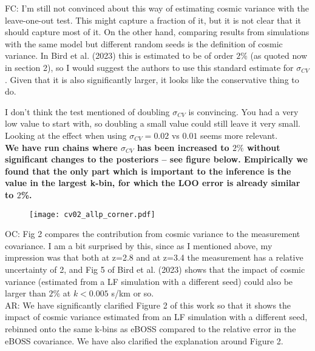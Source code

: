\documentclass[12pt]{article}
\begin{document}
FC: I’m still not convinced about this way of estimating cosmic variance with the leave-one-out test. This might capture a fraction of it, but it is not clear that it should capture most of it. On the other hand, comparing results from simulations with the same model but different random seeds is the definition of cosmic variance. In Bird et al. (2023) this is estimated to be of order $2\%$ (as quoted now in section 2), so I would suggest the authors to use this standard estimate for $\sigma_{CV}$. Given that it is also significantly larger, it looks like the conservative thing to do.

I don’t think the test mentioned of doubling $\sigma_{CV}$ is convincing. You had a very low value to start with, so doubling a small value could still leave it very small. Looking at the effect when using $\sigma_{CV} = 0.02$ vs $0.01$ seems more relevant.\\

\textbf{We have run chains where $\sigma_{CV}$ has been increased to $2\%$ without significant changes to the posteriors -- see figure below. Empirically we found that the only part which is important to the inference is the value in the largest k-bin, for which the LOO error is already similar to $2$\%.}

\begin{figure}[h!]
    \centering
    \texttt{[image: cv02\_allp\_corner.pdf]}
\end{figure}

\hrulefill \newline

OC: Fig 2 compares the contribution from cosmic variance to the measurement covariance. I am a bit surprised by this, since as I mentioned above, my impression was that both at z=2.8 and at z=3.4 the measurement has a relative uncertainty of 2, and Fig 5 of Bird et al. (2023) shows that the impact of cosmic variance (estimated from a LF simulation with a different seed) could also be larger than $2\%$ at $k < 0.005$ s/km or so.\\

AR: We have significantly clarified Figure 2 of this work so that it shows the impact of cosmic variance estimated from an LF simulation with a different seed, rebinned onto the same k-bins as eBOSS compared to the relative error in the eBOSS covariance. We have also clarified the explanation around Figure 2.\\
\end{document}
